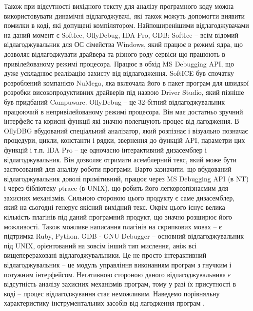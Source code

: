 Також при відсутності вихідного тексту для аналізу програмного коду можна використовувати динамічні відлагоджувачі, які також можуть допомогти виявити помилки в коді, які допущені компілятором.
Найпоширенішими відлагоджувачами на даний момент є SoftIce, OllyDebug, IDA Pro, GDB:
SoftIce – всім відомий відлагоджувальник для ОС сімейства Windows, який працює в режимі ядра, що дозволяє відлагоджувати драйвера та різного роду сервіси що працюють в привілейованому режимі процесора. Працює в обхід MS Debugging API, що дуже ускладнює реалізацію захисту від відлагодження. SoftICE  був спочатку розроблений компанією NuMega, яка включала його в пакет програм для швидкої розробки високопродуктивних драйверів під назвою Driver Studio, який пізніше був придбаний Compuware.
OllyDebug – це 32-бітний відлагоджувальник працюючий в непривілейованому режимі процесора. Він має достатньо зручний інтерфейс та корисні функції які значно полегшують процес від лагодження.  В OllyDBG вбудований спеціальний аналізатор, який розпізнає і візуально позначає процедури, цикли, константи і рядки, звернення до функцій API, параметри цих функцій і т.п.
IDA Pro – це одночасно інтерактивний дизасемблер і відлагоджувальник. Він дозволяє отримати асемблерний текс, який може бути застосований для аналізу роботи програми. Варто зазначити, що вбудований відлагоджувальник доволі примітивний, працює через MS Debugging API (в NT) і через бібліотеку ptrace (в UNIX), що робить його легкорозпізнаємим для захисних механізмів. Сильною стороною цього продукту є саме дизасемблер, який на сьогодні генерує якісний вихідний текс. Окрім цього існує велика кількість плагінів під даний програмний продукт, що значно розширює його можливості. Також можливе написання плагінів на скрипкових мовах – є підтримка Ruby, Python.
GDB - GNU Debugger – основний відлагоджувальник під UNIX, орієнтований на зовсім інший тип мислення, аніж всі вищеперераховані відлагоджувальники. Це не просто інтерактивний відлагоджувальник – це модуль управління виконанням програм з гнучким і потужним інтерфейсом. Негативною стороною даного відлагоджувальника є відсутність аналізу захисних механізмів програм, тому у разі їх присутності в коді – процес відлагоджування стає неможливим.
Наведемо порівняльну характеристику інструментальних засобів  від лагодження програм 
.

